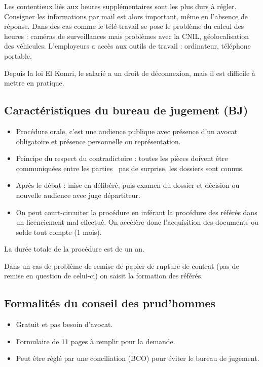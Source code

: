 	Les contentieux liés aux heures supplémentaires sont les plus durs à régler.
	Consigner les informations par mail est alors important, même en l'absence de réponse.
	Dans des cas comme le télé-travail se pose le problème du calcul des heures : caméras de surveillances mais problèmes avec la CNIL, géolocalisation des véhicules.
	L'employeurs a accès aux outils de travail : ordinateur, téléphone portable.
	
	Depuis la loi El Komri, le salarié a un droit de déconnexion, mais il est difficile à mettre en pratique.


\subsection{Caractéristiques du bureau de jugement (BJ)}

	\begin{itemize}
		\item[\textbullet] Procédure orale, c'est une audience publique avec présence d'un avocat obligatoire et présence personnelle ou représentation.
		\item[\textbullet] Principe du respect du contradictoire : toutes les pièces doivent être communiquées entre les parties \textrightarrow\ pas de surprise, les dossiers sont connus.
		\item[\textbullet] Après le débat : mise en délibéré, puis examen du dossier et décision ou nouvelle audience avec juge départiteur.
		\item[\textbullet] On peut court-circuiter la procédure en inférant la procédure des référés dans un licenciement mal effectué. On accélère donc l’acquisition des documents ou solde tout compte (1 mois).
	\end{itemize}

	La durée totale de la procédure est de un an.
	
	Dans un cas de problème de remise de papier de rupture de contrat (pas de remise en question de celui-ci) on saisit la formation des référés.


\subsection{Formalités du conseil des prud'hommes}

	\begin{itemize}
		\item[\textbullet] Gratuit et pas besoin d’avocat.
		\item[\textbullet] Formulaire de 11 pages à remplir pour la demande.
		\item[\textbullet] Peut être réglé par une conciliation (BCO) pour éviter le bureau de jugement.
	\end{itemize}
	
